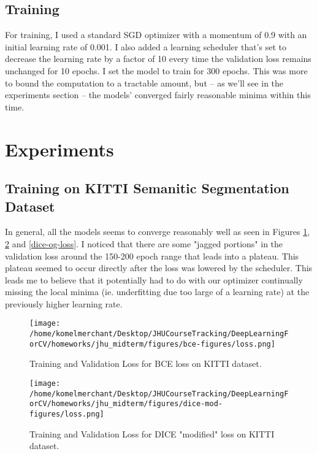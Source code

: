 \documentclass[Location Location Location! : Exploring Image Segmentation Problem In Urban Driving Scenarios]{IEEEtran}
\begin{document}
\subsection{Training}

For training, I used a standard SGD optimizer with a momentum of 0.9 with an initial learning rate of 0.001. I also added a learning scheduler that's set to decrease the learning rate by a factor of 10 every time the validation loss remains unchanged for 10 epochs. I set the model to train for 300 epochs. This was more to bound the computation to a tractable amount, but -- as we'll see in the experiments section -- the models' converged fairly reasonable minima within this time. 



\section{Experiments}


\subsection{Training on KITTI Semanitic Segmentation Dataset}

In general, all the models seems to converge reasonably well as seen in Figures \ref{bce-loss}, \ref{dice-mod-loss} and \ref{dice-og-loss}. I noticed that there are some "jagged portions" in the validation loss around the 150-200 epoch range that leads into a plateau. This plateau seemed to occur directly after the loss was lowered by the scheduler. This leads me to believe that it potentially had to do with our optimizer continually missing the local minima (ie. underfitting due too large of a learning rate) at the previously higher learning rate.  


\begin{figure}[htbp]
\centerline{\texttt{[image: /home/komelmerchant/Desktop/JHUCourseTracking/DeepLearningForCV/homeworks/jhu\_midterm/figures/bce-figures/loss.png]}}
\caption{Training and Validation Loss for BCE loss on KITTI dataset.}
\label{bce-loss}
\end{figure}


\begin{figure}[htbp]
\centerline{\texttt{[image: /home/komelmerchant/Desktop/JHUCourseTracking/DeepLearningForCV/homeworks/jhu\_midterm/figures/dice-mod-figures/loss.png]}}
\caption{Training and Validation Loss for DICE "modified" loss on KITTI dataset.}
\label{dice-mod-loss}
\end{figure}
\end{document}
